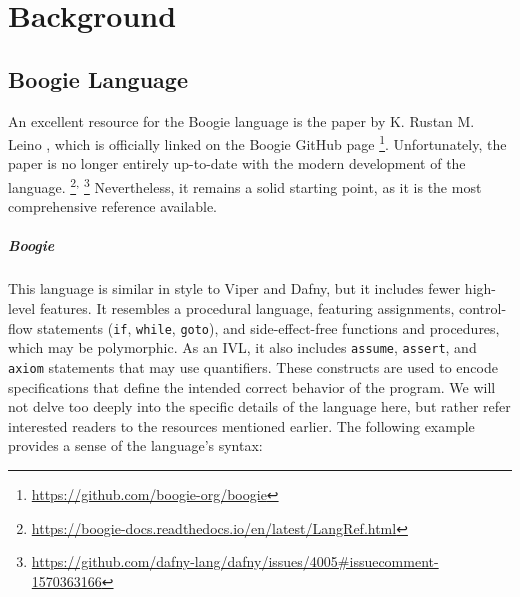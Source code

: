 \chapter{Background}
\label{sec:background}


\section{Boogie Language}

An excellent resource for the Boogie language is the paper by K. Rustan M. Leino \cite{leino2008boogie},
which is officially linked on the Boogie GitHub page
\footnote{\url{https://github.com/boogie-org/boogie}}.
Unfortunately, the paper is no longer entirely up-to-date with the modern development of the language.
\footnote{\url{https://boogie-docs.readthedocs.io/en/latest/LangRef.html}}\textsuperscript{,}
\footnote{\url{https://github.com/dafny-lang/dafny/issues/4005\#issuecomment-1570363166}}
Nevertheless, it remains a solid starting point, as it is the most comprehensive reference available.

\paragraph{Boogie} 
This language is similar in style to Viper and Dafny, but it includes fewer high-level features.
It resembles a procedural language, featuring assignments, control-flow statements (\lstinline[columns=fixed]{if}, \lstinline[columns=fixed]{while}, \lstinline[columns=fixed]{goto}),
and side-effect-free functions and procedures, which may be polymorphic.
As an IVL, it also includes \lstinline[columns=fixed]{assume}, \lstinline[columns=fixed]{assert},
and \lstinline[columns=fixed]{axiom} statements that may use quantifiers.
These constructs are used to encode specifications that define the intended correct behavior of the program.
We will not delve too deeply into the specific details of the language here,
but rather refer interested readers to the resources mentioned earlier.
The following example provides a sense of the language's syntax:


